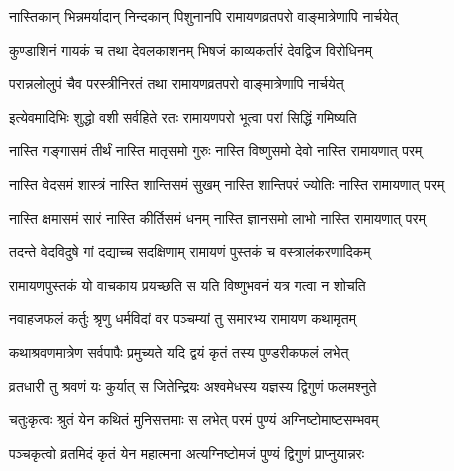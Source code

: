  

\twolineshloka
{नास्तिकान् भिन्नमर्यादान् निन्दकान् पिशुनानपि}
{रामायणव्रतपरो वाङ्‌‍मात्रेणापि नार्चयेत्}%

 

\twolineshloka
{कुण्डाशिनं गायकं च तथा देवलकाशनम्}
{भिषजं काव्यकर्तारं देवद्विज विरोधिनम्}%

 

\twolineshloka
{परान्नलोलुपं चैव परस्त्रीनिरतं तथा}
{रामायणव्रतपरो वाङ्‌मात्रेणापि नार्चयेत्}%

 

\twolineshloka
{इत्येवमादिभिः शुद्धो वशी सर्वहिते रतः}
{रामायणपरो भूत्वा परां सिद्धिं गमिष्यति}%

 

\twolineshloka
{नास्ति गङ्‍गासमं तीर्थं नास्ति मातृसमो गुरुः}
{नास्ति विष्णुसमो देवो नास्ति रामायणात् परम्}%

 

\twolineshloka
{नास्ति वेदसमं शास्त्रं नास्ति शान्तिसमं सुखम्}
{नास्ति शान्तिपरं ज्योतिः नास्ति रामायणात् परम्}%

 

\twolineshloka
{नास्ति क्षमासमं सारं नास्ति कीर्तिसमं धनम्}
{नास्ति ज्ञानसमो लाभो नास्ति रामायणात् परम्}%

 

\twolineshloka
{तदन्ते वेदविदुषे गां दद्याच्च सदक्षिणाम्}
{रामायणं पुस्तकं च वस्त्रालंकरणादिकम्}%

 

\twolineshloka
{रामायणपुस्तकं यो वाचकाय प्रयच्छति}
{स यति विष्णुभवनं यत्र गत्वा न शोचति}%

 

\twolineshloka
{नवाहजफलं कर्तुः श्रृणु धर्मविदां वर}
{पञ्चम्यां तु समारभ्य रामायण कथामृतम्}%

 

\twolineshloka
{कथाश्रवणमात्रेण सर्वपापैः प्रमुच्यते}
{यदि द्वयं कृतं तस्य पुण्डरीकफलं लभेत्}%

 

\twolineshloka
{व्रतधारी तु श्रवणं यः कुर्यात् स जितेन्द्रियः}
{अश्वमेधस्य यज्ञस्य द्विगुणं फलमश्नुते}%

 

\twolineshloka
{चतुःकृत्वः श्रुतं येन कथितं मुनिसत्तमाः}
{स लभेत् परमं पुण्यं अग्निष्टोमाष्टसम्भवम्}%

 

\twolineshloka
{पञ्चकृत्वो व्रतमिदं कृतं येन महात्मना}
{अत्यग्निष्टोमजं पुण्यं द्विगुणं प्राप्नुयान्नरः}%

